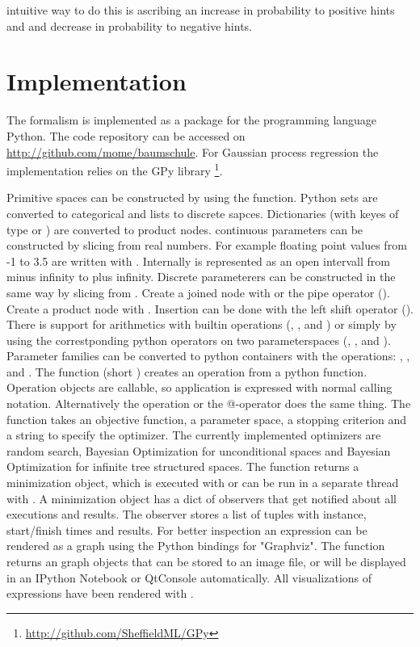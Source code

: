 \documentclass[english]{article}
\begin{document}
intuitive way to do this is ascribing an increase in probability to positive hints and and decrease in probability to negative hints.


\section{Implementation}
The formalism is implemented as a package for the programming language Python. The code repository can be accessed on \url{http://github.com/mome/baumschule}. For Gaussian process regression the implementation relies on the GPy library \footnote{\url{http://github.com/SheffieldML/GPy}}.

Primitive spaces can be constructed by using the  function. Python sets are converted to categorical and lists to discrete sapces. Dictionaries (with keyes of type  or ) are converted to product nodes. continuous parameters can be constructed by slicing from real numbers. For example floating point values from -1 to 3.5 are written with . Internally  is represented as an open intervall from minus infinity to plus infinity. Discrete parameterers can be constructed in the same way by slicing from . Create a joined node with  or the pipe operator (\python{|}). Create a product node with . Insertion can be done with the left shift operator (\python{<<}). There is support for arithmetics with builtin operations (, ,  and ) or simply by using the correstponding python operators on two parameterspaces (\python{+}, \python{-}, \python{*} and \python{/}). Parameter families can be converted to python containers with the operations: , ,  and .
The  function (short ) creates an operation from a python function. Operation objects are callable, so application is expressed with normal calling notation. Alternatively the  operation or the @-operator does the same thing. The  function takes an objective function, a parameter space, a stopping criterion and a string to specify the optimizer.  The currently implemented optimizers are random search, Bayesian Optimization for unconditional spaces and Bayesian Optimization for infinite tree structured spaces. The  function returns a minimization object, which is executed with  or can be run in a separate thread with . A minimization object has a dict of observers that get notified about all executions and results. The  observer stores a list of tuples with instance, start/finish times and results.
For better inspection an expression can be rendered as a graph using the Python bindings for "Graphviz". The  function returns an graph objects that can be stored to an image file, or will be displayed in an IPython Notebook or QtConsole automatically. All visualizations of expressions have been rendered with .
\end{document}
